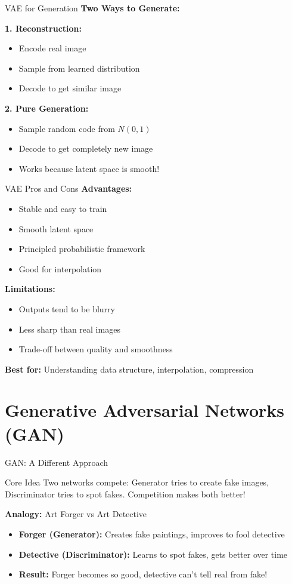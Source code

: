 \documentclass[aspectratio=169,10pt]{beamer}
\begin{document}
\begin{frame}{VAE for Generation}
\textbf{Two Ways to Generate:}

\textbf{1. Reconstruction:}
\begin{itemize}
\item Encode real image
\item Sample from learned distribution
\item Decode to get similar image
\end{itemize}

\textbf{2. Pure Generation:}
\begin{itemize}
\item Sample random code from $N(0,1)$
\item Decode to get completely new image
\item Works because latent space is smooth!
\end{itemize}
\end{frame}

\begin{frame}{VAE Pros and Cons}
\textbf{Advantages:}
\begin{itemize}
\item Stable and easy to train
\item Smooth latent space
\item Principled probabilistic framework
\item Good for interpolation
\end{itemize}

\textbf{Limitations:}
\begin{itemize}
\item Outputs tend to be blurry
\item Less sharp than real images
\item Trade-off between quality and smoothness
\end{itemize}

\textbf{Best for:} Understanding data structure, interpolation, compression
\end{frame}

\section{Generative Adversarial Networks (GAN)}

\begin{frame}{GAN: A Different Approach}
\begin{alertblock}{Core Idea}
Two networks compete: Generator tries to create fake images, Discriminator tries to spot fakes. Competition makes both better!
\end{alertblock}

\textbf{Analogy:} Art Forger vs Art Detective
\begin{itemize}
\item \textbf{Forger (Generator):} Creates fake paintings, improves to fool detective
\item \textbf{Detective (Discriminator):} Learns to spot fakes, gets better over time
\item \textbf{Result:} Forger becomes so good, detective can't tell real from fake!
\end{itemize}
\end{frame}
\end{document}
